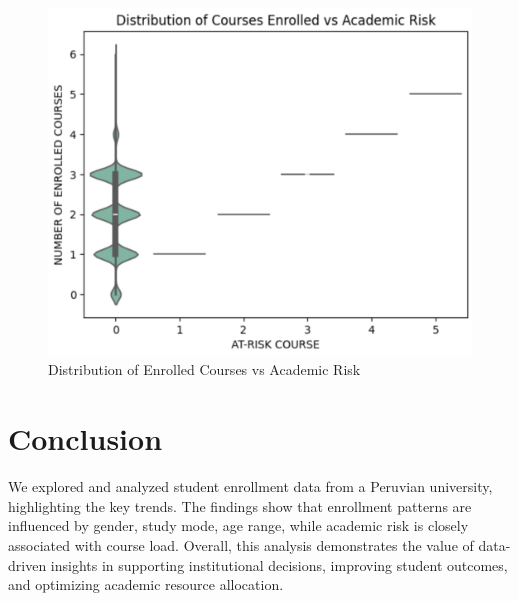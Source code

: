 \documentclass[12pt]{article}
\begin{document}
\begin{figure}[H]
    \centering
    \includegraphics[width=0.8\linewidth]{violinplot_academic_risk.png}
    \caption{Distribution of Enrolled Courses vs Academic Risk}
\end{figure}

\section{Conclusion}
We explored and analyzed student enrollment data from a Peruvian university, highlighting the key trends. The findings show that enrollment patterns are influenced by gender, study mode, age range, while academic risk is closely associated with course load. Overall, this analysis demonstrates the value of data-driven insights in supporting institutional decisions, improving student outcomes, and optimizing academic resource allocation.
\end{document}
